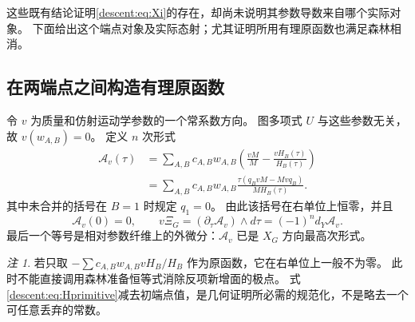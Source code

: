 \documentclass[11pt,a4paper,oneside]{ctexart}
\theoremstyle{cnplain}
\theoremstyle{definition}
\theoremstyle{remark}
\newtheorem{remark}[theorem]{注}
\numberwithin{equation}{section}
\begin{document}
这些既有结论证明\eqref{descent:eq:Xi}的存在，却尚未说明其参数导数来自哪个实际对象。
下面给出这个端点对象及实际态射；尤其证明所用有理原函数也满足森林相消。


\subsection{在两端点之间构造有理原函数}
令 $v$ 为质量和仿射运动学参数的一个常系数方向。
图多项式 $U$ 与这些参数无关，故 $v(w_{A,B})=0$。
定义 $n$ 次形式
\begin{align}\label{descent:eq:Hprimitive}
 \mathcal A_v(\tau)
 &=\sum_{A,B}c_{A,B}w_{A,B}
       \left(\frac{vM}{M}-\frac{vH_B(\tau)}{H_B(\tau)}\right)\nonumber\\
 &=\sum_{A,B}c_{A,B}w_{A,B}
       \frac{\tau(q_BvM-Mvq_B)}{M H_B(\tau)}.
\end{align}
其中未合并的括号在 $B=1$ 时规定 $q_1=0$。
由此该括号在右单位上恒零，并且
\begin{equation}\label{descent:eq:endpointzero}
 \mathcal A_v(0)=0,\qquad
 v\Xi_G=(\partial_\tau\mathcal A_v)\wedge d\tau
             =(-1)^n d_Y\mathcal A_v.
\end{equation}
最后一个等号是相对参数纤维上的外微分：$\mathcal A_v$ 已是 $X_G$ 方向最高次形式。

\begin{remark}
若只取 $-\sum c_{A,B}w_{A,B}vH_B/H_B$ 作为原函数，它在右单位上一般不为零。
此时不能直接调用森林准备恒等式消除反项新增面的极点。
式\eqref{descent:eq:Hprimitive}减去初端点值，是几何证明所必需的规范化，不是略去一个可任意丢弃的常数。
\end{remark}
\end{document}
